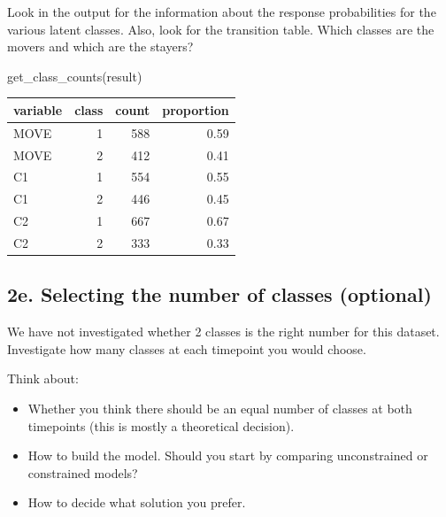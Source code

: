 \documentclass[
]{book}
\newenvironment{Shaded}{\begin{snugshade}}{\end{snugshade}}
\newcommand{\FunctionTok}[1]{\textcolor[rgb]{0.00,0.00,0.00}{#1}}
\newcommand{\NormalTok}[1]{#1}
\providecommand{\tightlist}{%
  \setlength{\itemsep}{0pt}\setlength{\parskip}{0pt}}
\begin{document}
Look in the output for the information about the response probabilities for the various latent classes. Also, look for the transition table. Which classes are the movers and which are the stayers?

\begin{Shaded}
\begin{Highlighting}[]
\FunctionTok{get\_class\_counts}\NormalTok{(result)}
\end{Highlighting}
\end{Shaded}

\begin{tabular}[t]{l|r|r|r}
\hline
variable & class & count & proportion\\
\hline
MOVE & 1 & 588 & 0.59\\
\hline
MOVE & 2 & 412 & 0.41\\
\hline
C1 & 1 & 554 & 0.55\\
\hline
C1 & 2 & 446 & 0.45\\
\hline
C2 & 1 & 667 & 0.67\\
\hline
C2 & 2 & 333 & 0.33\\
\hline
\end{tabular}

\hypertarget{e.-selecting-the-number-of-classes-optional}{%
\subsection{2e. Selecting the number of classes (optional)}\label{e.-selecting-the-number-of-classes-optional}}

We have not investigated whether 2 classes is the right number for this dataset. Investigate how many classes at each timepoint you would choose.

Think about:

\begin{itemize}
\tightlist
\item
  Whether you think there should be an equal number of classes at both timepoints (this is mostly a theoretical decision).
\item
  How to build the model. Should you start by comparing unconstrained or constrained models?
\item
  How to decide what solution you prefer.
\end{itemize}
\end{document}
